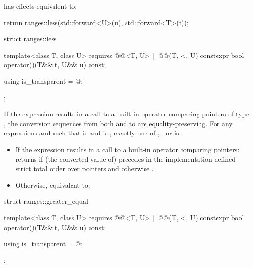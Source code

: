 \begin{itemdescr}
\pnum
{} has effects equivalent to:
\begin{codeblock}
return ranges::less{}(std::forward<U>(u), std::forward<T>(t));
\end{codeblock}
\end{itemdescr}

%
\begin{itemdecl}
struct ranges::less {
  template<class T, class U>
    requires @@<T, U> || @@(T, <, U)
  constexpr bool operator()(T&& t, U&& u) const;

  using is_transparent = @\unspecnc@;
};
\end{itemdecl}

\begin{itemdescr}
\pnum
\expects
If the expression  results in a
call to a built-in operator \tcode{<} comparing pointers of type , the
conversion sequences from both  and  to  are
equality-preserving. For any expressions
 and  such that  is  and
 is , exactly one of
,
, or
is .

\pnum
\effects
\begin{itemize}
\item
If the expression  results in a
call to a built-in operator \tcode{<} comparing pointers:
returns  if (the converted value of)  precedes  in
the implementation-defined strict total order over pointers
and otherwise .

\item
Otherwise, equivalent to:
\end{itemize}
\end{itemdescr}

%
\begin{itemdecl}
struct ranges::greater_equal {
  template<class T, class U>
    requires @@<T, U> || @@(T, <, U)
  constexpr bool operator()(T&& t, U&& u) const;

  using is_transparent = @\unspecnc@;
};
\end{itemdecl}

